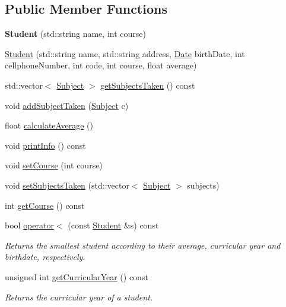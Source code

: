 \subsection*{Public Member Functions}
\begin{DoxyCompactItemize}
\item 
\mbox{\label{classStudent_a180b54eea798e901422c7763b39aca67}} 
{\bfseries Student} (std\+::string name, int course)
\item 
\hyperlink{classStudent_a048addf53c9fe5b126ec7656fbe701ad}{Student} (std\+::string name, std\+::string address, \hyperlink{classDate}{Date} birth\+Date, int cellphone\+Number, int code, int course, float average)
\item 
std\+::vector$<$ \hyperlink{classSubject}{Subject} $>$ \hyperlink{classStudent_a5db626d71418122132a534983d2a9c06}{get\+Subjects\+Taken} () const
\item 
void \hyperlink{classStudent_a0d882d0880d67c5d8b8df3cfe4ceec16}{add\+Subject\+Taken} (\hyperlink{classSubject}{Subject} c)
\item 
float \hyperlink{classStudent_a4bb700692481cee418c225d9fd27317d}{calculate\+Average} ()
\item 
void \hyperlink{classStudent_a3567f5c4220ffa88a8855998b3b99b43}{print\+Info} () const
\item 
void \hyperlink{classStudent_af7affdfd5b1b9e4d8c8d1fcb1e2cc631}{set\+Course} (int course)
\item 
void \hyperlink{classStudent_a2a24ebdce323c9cea4060b1cd9d343c9}{set\+Subjects\+Taken} (std\+::vector$<$ \hyperlink{classSubject}{Subject} $>$ subjects)
\item 
int \hyperlink{classStudent_a7ca1414a43b0c0194defe9a7929567a2}{get\+Course} () const
\item 
bool \hyperlink{classStudent_aabc24d469d7206a621fa154b3578d9e0}{operator$<$} (const \hyperlink{classStudent}{Student} \&s) const
\begin{DoxyCompactList}\small\item\em Returns the smallest student according to their average, curricular year and birthdate, respectively. \end{DoxyCompactList}\item 
unsigned int \hyperlink{classStudent_a40e4932da73265df93cf942d162c41b3}{get\+Curricular\+Year} () const
\begin{DoxyCompactList}\small\item\em Returns the curricular year of a student. \end{DoxyCompactList}\item 

\end{DoxyCompactItemize}
